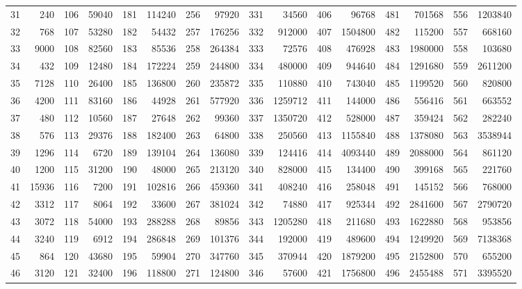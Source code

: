 \documentclass[11pt]{amsart}
\theoremstyle{remark}
\theoremstyle{plain}
\numberwithin{equation}{section}
\renewcommand{\(}{\left(}
\renewcommand{\)}{\right)}
\begin{document}
{\begin{table}
\begin{tabular}{|lr|lr|lr|lr|lr|lr|lr|lr|}
   31 & 240 &  106 & 59040 &  181 & 114240 &  256 & 97920 &  331 & 34560 &  406 & 96768 &  481 & 701568 &  556 & 1203840 \\
   32 & 768 &  107 & 53280 &  182 & 54432 &  257 & 176256 &  332 & 912000 &  407 & 1504800 &  482 & 115200 &  557 & 668160 \\
   33 & 9000 &  108 & 82560 &  183 & 85536 &  258 & 264384 &  333 & 72576 &  408 & 476928 &  483 & 1980000 &  558 & 103680 \\
   34 & 432 &  109 & 12480 &  184 & 172224 &  259 & 244800 &  334 & 480000 &  409 & 944640 &  484 & 1291680 &  559 & 2611200 \\
   35 & 7128 &  110 & 26400 &  185 & 136800 &  260 & 235872 &  335 & 110880 &  410 & 743040 &  485 & 1199520 &  560 & 820800 \\
   36 & 4200 &  111 & 83160 &  186 & 44928 &  261 & 577920 &  336 & 1259712 &  411 & 144000 &  486 & 556416 &  561 & 663552 \\
   37 & 480 &  112 & 10560 &  187 & 27648 &  262 & 99360 &  337 & 1350720 &  412 & 528000 &  487 & 359424 &  562 & 282240 \\
   38 & 576 &  113 & 29376 &  188 & 182400 &  263 & 64800 &  338 & 250560 &  413 & 1155840 &  488 & 1378080 &  563 & 3538944 \\
   39 & 1296 &  114 & 6720 &  189 & 139104 &  264 & 136080 &  339 & 124416 &  414 & 4093440 &  489 & 2088000 &  564 & 861120 \\
   40 & 1200 &  115 & 31200 &  190 & 48000 &  265 & 213120 &  340 & 828000 &  415 & 134400 &  490 & 399168 &  565 & 221760 \\
   41 & 15936 &  116 & 7200 &  191 & 102816 &  266 & 459360 &  341 & 408240 &  416 & 258048 &  491 & 145152 &  566 & 768000 \\
   42 & 3312 &  117 & 8064 &  192 & 33600 &  267 & 381024 &  342 & 74880 &  417 & 925344 &  492 & 2841600 &  567 & 2790720 \\
   43 & 3072 &  118 & 54000 &  193 & 288288 &  268 & 89856 &  343 & 1205280 &  418 & 211680 &  493 & 1622880 &  568 & 953856 \\
   44 & 3240 &  119 & 6912 &  194 & 286848 &  269 & 101376 &  344 & 192000 &  419 & 489600 &  494 & 1249920 &  569 & 7138368 \\
   45 & 864 &  120 & 43680 &  195 & 59904 &  270 & 347760 &  345 & 370944 &  420 & 1879200 &  495 & 2152800 &  570 & 655200 \\
   46 & 3120 &  121 & 32400 &  196 & 118800 &  271 & 124800 &  346 & 57600 &  421 & 1756800 &  496 & 2455488 &  571 & 3395520 \\

\end{tabular}
\end{table}}
\end{document}
